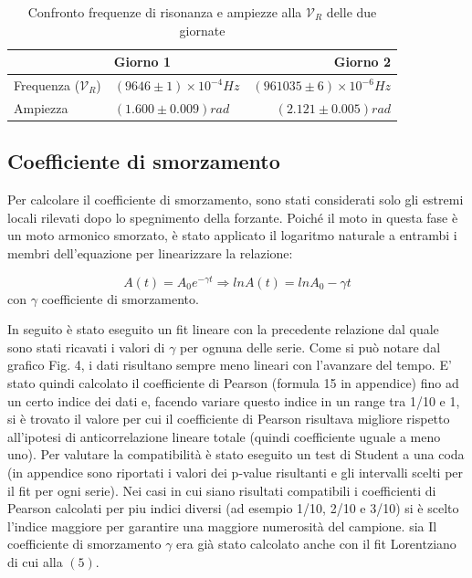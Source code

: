 \documentclass{article}
\begin{document}
\begin{table}[h!]
    \centering
    \begin{tabular}{llr}
      \toprule \hline
      & Giorno 1 & Giorno 2 \\
      \midrule
      Frequenza ($\mathcal{V}_R$) & $(9646 \pm 1) \times 10^{-4}Hz$ & $(961035 \pm 6) \times 10^{-6}Hz$ \\
      \midrule
      Ampiezza & $(1.600 \pm 0.009) rad$ & $(2.121 \pm 0.005) rad$ \\
      \bottomrule
    \end{tabular}
    \caption{Confronto frequenze di risonanza e ampiezze alla $\mathcal{V}_R$ delle due giornate}
    \label{confronto_risonanza}
\end{table}

\subsection{Coefficiente di smorzamento}
Per calcolare il coefficiente di smorzamento, sono stati considerati solo gli estremi locali rilevati dopo lo spegnimento della forzante. Poiché il moto in questa fase è un moto armonico smorzato, è stato applicato il logaritmo naturale a entrambi i membri dell’equazione per linearizzare la relazione:

\begin{equation}
    A(t)= A_0 e^{-\gamma t} \Rightarrow lnA(t)=lnA_0-\gamma t
\end{equation}
con $\gamma$ coefficiente di smorzamento.


In seguito è stato eseguito un fit lineare con la precedente relazione dal quale sono stati ricavati i valori di $\gamma$ per ognuna delle serie. Come si può notare dal grafico Fig. 4, i dati risultano sempre meno lineari con l'avanzare del tempo. E' stato quindi calcolato il coefficiente di Pearson (formula 15 in appendice) fino ad un certo indice dei dati e, facendo variare questo indice in un range tra 1/10 e 1, si è trovato il valore per cui il coefficiente di Pearson risultava migliore rispetto all'ipotesi di anticorrelazione lineare totale (quindi coefficiente uguale a meno uno). Per valutare la compatibilità è stato eseguito un test di Student a una coda (in appendice sono riportati i valori dei p-value risultanti e gli intervalli scelti per il fit per ogni serie). Nei casi in cui siano risultati compatibili i coefficienti di Pearson calcolati per piu indici diversi (ad esempio 1/10, 2/10 e 3/10) si è scelto l'indice maggiore per garantire una maggiore numerosità del campione. sia  Il coefficiente di smorzamento $\gamma$ era già stato calcolato anche con il fit Lorentziano di cui alla $(5)$.
\end{document}

